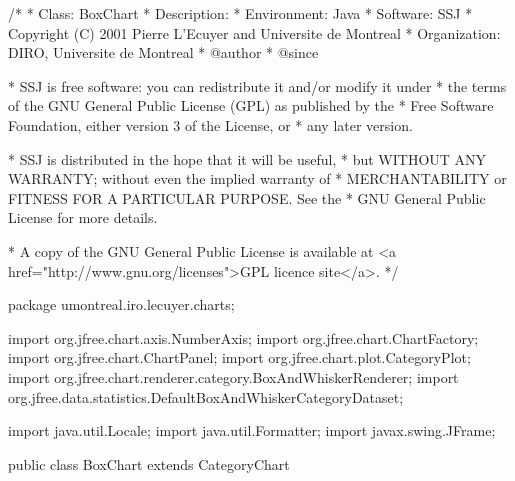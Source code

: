 \begin{code}
\begin{hide}
/*
 * Class:        BoxChart
 * Description:  
 * Environment:  Java
 * Software:     SSJ 
 * Copyright (C) 2001  Pierre L'Ecuyer and Universite de Montreal
 * Organization: DIRO, Universite de Montreal
 * @author       
 * @since

 * SSJ is free software: you can redistribute it and/or modify it under
 * the terms of the GNU General Public License (GPL) as published by the
 * Free Software Foundation, either version 3 of the License, or
 * any later version.

 * SSJ is distributed in the hope that it will be useful,
 * but WITHOUT ANY WARRANTY; without even the implied warranty of
 * MERCHANTABILITY or FITNESS FOR A PARTICULAR PURPOSE.  See the
 * GNU General Public License for more details.

 * A copy of the GNU General Public License is available at
   <a href="http://www.gnu.org/licenses">GPL licence site</a>.
 */
\end{hide}
package umontreal.iro.lecuyer.charts;\begin{hide}

import   org.jfree.chart.axis.NumberAxis;
import   org.jfree.chart.ChartFactory;
import   org.jfree.chart.ChartPanel;
import   org.jfree.chart.plot.CategoryPlot;
import   org.jfree.chart.renderer.category.BoxAndWhiskerRenderer;
import   org.jfree.data.statistics.DefaultBoxAndWhiskerCategoryDataset;

import   java.util.Locale;
import   java.util.Formatter;
import   javax.swing.JFrame;
\end{hide}


public class BoxChart extends CategoryChart \begin{hide} {

   protected void init (String title, String XLabel, String YLabel) {
      // create the chart...
      chart = ChartFactory.createBoxAndWhiskerChart (
         title,                         // chart title
         XLabel,                        // x axis label
         YLabel,                        // y axis label
         (DefaultBoxAndWhiskerCategoryDataset)dataset.getSeriesCollection(), // data
         true                          // include legend
      );

      ((CategoryPlot)chart.getPlot()).setRenderer(dataset.getRenderer());
      // Initialize axis variables
      initAxis();
   }

   protected void initAxis(){
      YAxis = new Axis((NumberAxis)((CategoryPlot) chart.getPlot()).getRangeAxis(),
                        Axis.ORIENTATION_VERTICAL);
      setAutoRange();
   }
\end{hide}
\end{code}

